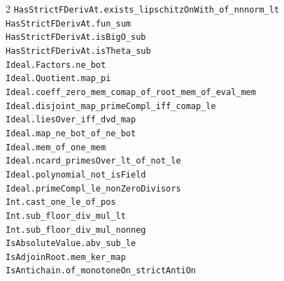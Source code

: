 \documentclass[10pt,a4paper]{article}
\begin{document}
\begin{multicols}{2}
\texttt{HasStrictFDerivAt.\allowbreak{}exists\_lipschitzOnWith\_of\_nnnorm\_lt} \\
\texttt{HasStrictFDerivAt.\allowbreak{}fun\_sum} \\
\texttt{HasStrictFDerivAt.\allowbreak{}isBigO\_sub} \\
\texttt{HasStrictFDerivAt.\allowbreak{}isTheta\_sub} \\
\texttt{Ideal.\allowbreak{}Factors.\allowbreak{}ne\_bot} \\
\texttt{Ideal.\allowbreak{}Quotient.\allowbreak{}map\_pi} \\
\texttt{Ideal.\allowbreak{}coeff\_zero\_mem\_comap\_of\_root\_mem\_of\_eval\_mem} \\
\texttt{Ideal.\allowbreak{}disjoint\_map\_primeCompl\_iff\_comap\_le} \\
\texttt{Ideal.\allowbreak{}liesOver\_iff\_dvd\_map} \\
\texttt{Ideal.\allowbreak{}map\_ne\_bot\_of\_ne\_bot} \\
\texttt{Ideal.\allowbreak{}mem\_of\_one\_mem} \\
\texttt{Ideal.\allowbreak{}ncard\_primesOver\_lt\_of\_not\_le} \\
\texttt{Ideal.\allowbreak{}polynomial\_not\_isField} \\
\texttt{Ideal.\allowbreak{}primeCompl\_le\_nonZeroDivisors} \\
\texttt{Int.\allowbreak{}cast\_one\_le\_of\_pos} \\
\texttt{Int.\allowbreak{}sub\_floor\_div\_mul\_lt} \\
\texttt{Int.\allowbreak{}sub\_floor\_div\_mul\_nonneg} \\
\texttt{IsAbsoluteValue.\allowbreak{}abv\_sub\_le} \\
\texttt{IsAdjoinRoot.\allowbreak{}mem\_ker\_map} \\
\texttt{IsAntichain.\allowbreak{}of\_monotoneOn\_strictAntiOn} \\

\end{multicols}
\end{document}
